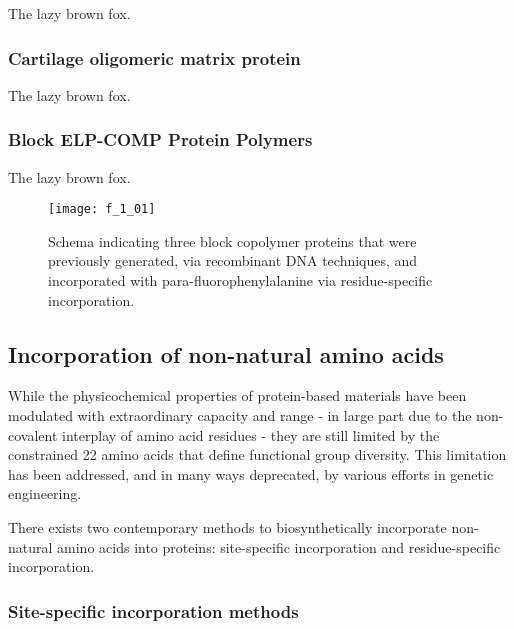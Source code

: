 \begin{refsection}
The lazy brown fox.

\subsubsection{Cartilage oligomeric matrix protein}

The lazy brown fox.

\subsubsection{Block ELP-COMP Protein Polymers}

The lazy brown fox.

\begin{figure}[h!]
    \centering
    \texttt{[image: f\_1\_01]}
    \caption{Schema indicating three block copolymer proteins that were
        previously generated, via recombinant DNA techniques, and incorporated
    with para-fluorophenylalanine via residue-specific incorporation.
    }
    \label{fig:pff_proteins}
\end{figure}

\subsection{Incorporation of non-natural amino acids}

While the physicochemical properties of protein-based materials have been
modulated with extraordinary capacity and range\cite{} - in large part due to
the non-covalent interplay of amino acid residues - they are still limited by
the constrained 22 amino acids that define functional group diversity.\cite{}
This limitation has been addressed, and in many ways deprecated, by various
efforts in genetic engineering.\cite{} 

There exists two contemporary methods to biosynthetically incorporate
non-natural amino acids into proteins: site-specific incorporation and
residue-specific incorporation.

\subsubsection{Site-specific incorporation methods} 



\end{refsection}
